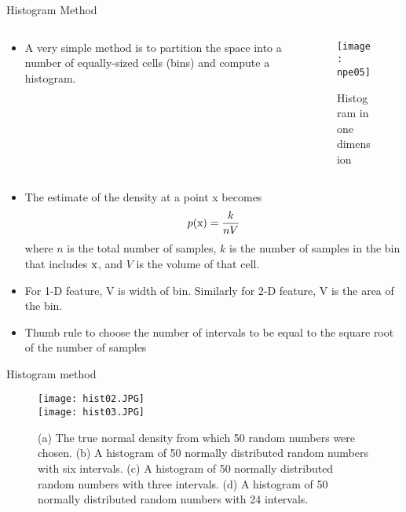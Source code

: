 \begin{frame}{Histogram Method}
\vspace{-0.5cm}
\begin{columns}
\begin{column}{5cm}
\begin{footnotesize}
\begin{itemize}
\item A very simple method is to
partition the space into a
number of equally-sized
cells (bins) and compute a
histogram.
\end{itemize}
\end{footnotesize}
\end{column}
\begin{column}{5cm}
\begin{figure}
\texttt{[image: npe05]}
\caption{Histogram in one dimension}
\end{figure}
\end{column}
\end{columns}
\begin{footnotesize}
\begin{itemize}
\item The estimate of the density at a point x becomes
\begin{equation}
p({\rm x})=\frac{k}{nV} \nonumber
\end{equation}
where $n$ is the total number of samples, $k$ is the number of samples in the bin that includes ${\rm x}$, and $V$ is the volume of that cell.
\item For 1-D feature, V is width of bin. Similarly for 2-D feature, V is the area of the bin.
\item Thumb rule to choose the number of intervals to be equal to the square root of the number of samples
\end{itemize}
\end{footnotesize}
\end{frame}

\begin{frame}{Histogram method}
\begin{figure}
\texttt{[image: hist02.JPG]}\\
\texttt{[image: hist03.JPG]}
\caption{{\scriptsize (a) The true normal density from which 50 random numbers were chosen. (b) A histogram of 50 normally distributed random numbers with six intervals. (c) A histogram of 50 normally distributed random numbers with three intervals. (d) A histogram of 50 normally distributed random numbers with 24 intervals.}}
\end{figure}
\end{frame}

